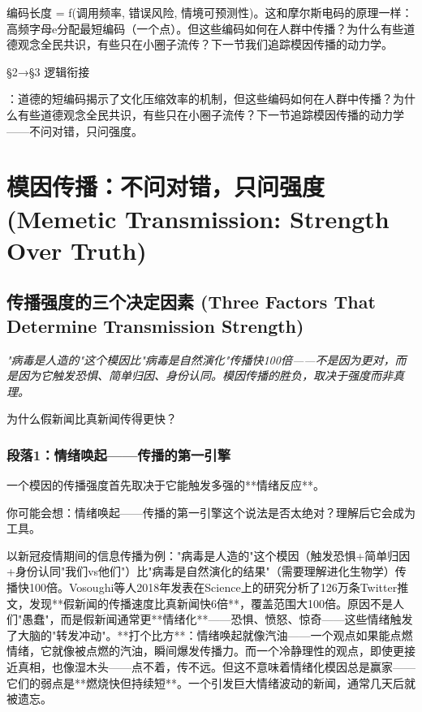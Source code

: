 \documentclass[a4paper,12pt]{book}
\newenvironment{motivation}{\begin{tcolorbox}[colback=gray!10,colframe=gray!60,title=\textit{本章动机 (Motivation)},fonttitle=\bfseries,arc=0mm,leftrule=3mm]\small\itshape}{\end{tcolorbox}}
\newenvironment{questionbox}{\begin{tcolorbox}[colback=red!3!white,colframe=red!60!black]}{\end{tcolorbox}}
\begin{document}
\begin{motivation}
\begin{motivation}
\begin{motivation}
{编码长度 = f(调用频率, 错误风险, 情境可预测性)。这和摩尔斯电码的原理一样：高频字母e分配最短编码（一个点）。但这些编码如何在人群中传播？为什么有些道德观念全民共识，有些只在小圈子流传？下一节我们追踪模因传播的动力学。


	§2→§3 逻辑衔接}：道德的短编码揭示了文化压缩效率的机制，但这些编码如何在人群中传播？为什么有些道德观念全民共识，有些只在小圈子流传？下一节追踪模因传播的动力学——不问对错，只问强度。

	\section{模因传播：不问对错，只问强度 (Memetic Transmission: Strength Over Truth)}

	\subsection{传播强度的三个决定因素 (Three Factors That Determine Transmission Strength)}
	\begin{motivation}
		"病毒是人造的"这个模因比"病毒是自然演化"传播快100倍——不是因为更对，而是因为它触发恐惧、简单归因、身份认同。模因传播的胜负，取决于强度而非真理。
	\end{motivation}
	\begin{questionbox}
		为什么假新闻比真新闻传得更快？
	\end{questionbox}

	\subsubsection*{段落1：情绪唤起——传播的第一引擎}
	一个模因的传播强度首先取决于它能触发多强的**情绪反应**。
	\begin{tcolorbox}[colback=yellow!5, title=\textit{读者行为预测}]
		你可能会想：情绪唤起——传播的第一引擎这个说法是否太绝对？理解后它会成为工具。
	\end{tcolorbox}

以新冠疫情期间的信息传播为例："病毒是人造的"这个模因（触发恐惧+简单归因+身份认同"我们vs他们"）比"病毒是自然演化的结果"（需要理解进化生物学）传播快100倍。Vosoughi等人2018年发表在Science上的研究分析了126万条Twitter推文，发现**假新闻的传播速度比真新闻快6倍**，覆盖范围大100倍。原因不是人们"愚蠢"，而是假新闻通常更**情绪化**——恐惧、愤怒、惊奇——这些情绪触发了大脑的"转发冲动"。**打个比方**：情绪唤起就像汽油——一个观点如果能点燃情绪，它就像被点燃的汽油，瞬间爆发传播力。而一个冷静理性的观点，即使更接近真相，也像湿木头——点不着，传不远。但这不意味着情绪化模因总是赢家——它们的弱点是**燃烧快但持续短**。一个引发巨大情绪波动的新闻，通常几天后就被遗忘。


\end{motivation}
\end{motivation}
\end{motivation}
\end{document}
